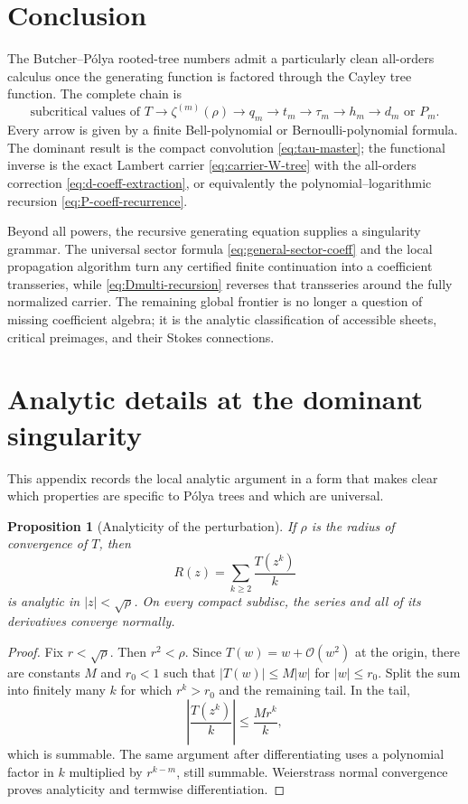 \documentclass[11pt,oneside]{article}
\numberwithin{equation}{section}
\theoremstyle{plain}
\newtheorem{proposition}[theorem]{Proposition}
\theoremstyle{definition}
\theoremstyle{remark}
\newcommand{\Ord}{\mathcal O}
\begin{document}
\section{Conclusion}

The Butcher--P\'olya rooted-tree numbers admit a particularly clean
all-orders calculus once the generating function is factored through the
Cayley tree function.  The complete chain is
\[
 \text{subcritical values of }T
 \longrightarrow \zeta^{(m)}(\rho)
 \longrightarrow q_m
 \longrightarrow t_m
 \longrightarrow \tau_m
 \longrightarrow h_m
 \longrightarrow d_m\text{ or }P_m.
\]
Every arrow is given by a finite Bell-polynomial or Bernoulli-polynomial
formula.  The dominant result is the compact convolution
\eqref{eq:tau-master}; the functional inverse is the exact Lambert carrier
\eqref{eq:carrier-W-tree} with the all-orders correction
\eqref{eq:d-coeff-extraction}, or equivalently the polynomial--logarithmic
recursion \eqref{eq:P-coeff-recurrence}.

Beyond all powers, the recursive generating equation supplies a singularity
grammar.  The universal sector formula \eqref{eq:general-sector-coeff} and
the local propagation algorithm turn any certified finite continuation into
a coefficient transseries, while \eqref{eq:Dmulti-recursion} reverses that
transseries around the fully normalized carrier.  The remaining global
frontier is no longer a question of missing coefficient algebra; it is the
analytic classification of accessible sheets, critical preimages, and their
Stokes connections.

\appendix

\section{Analytic details at the dominant singularity}\label{app:analytic}

This appendix records the local analytic argument in a form that makes clear
which properties are specific to P\'olya trees and which are universal.

\begin{proposition}[Analyticity of the perturbation]\label{prop:R-analytic}
If $\rho$ is the radius of convergence of $T$, then
\[
 R(z)=\sum_{k\ge2}\frac{T(z^k)}k
\]
is analytic in $|z|<\sqrt\rho$.  On every compact subdisc, the series and all
of its derivatives converge normally.
\end{proposition}

\begin{proof}
Fix $r<\sqrt\rho$.  Then $r^2<\rho$.  Since $T(w)=w+\Ord(w^2)$ at the
origin, there are constants $M$ and $r_0<1$ such that
$|T(w)|\le M|w|$ for $|w|\le r_0$.  Split the sum into finitely many $k$
for which $r^k>r_0$ and the remaining tail.  In the tail,
\[
 \left|\frac{T(z^k)}k\right|\le\frac{M r^k}{k},
\]
which is summable.  The same argument after differentiating uses a polynomial
factor in $k$ multiplied by $r^{k-m}$, still summable.  Weierstrass normal
convergence proves analyticity and termwise differentiation.
\end{proof}
\end{document}
